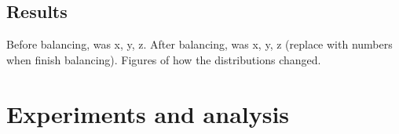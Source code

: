 \documentclass[10pt,twocolumn,letterpaper]{article}
\begin{document}
\subsection{Results}
Before balancing, was x, y, z. After balancing, was x, y, z (replace with numbers when finish balancing). Figures of how the distributions changed. 



\section{Experiments and analysis}




\end{document}

